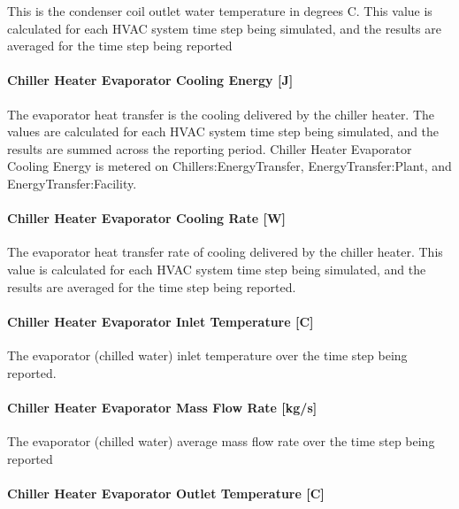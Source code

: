 This is the condenser coil outlet water temperature in degrees C. This value is calculated for each HVAC system time step being simulated, and the results are averaged for the time step being reported

\paragraph{Chiller Heater Evaporator Cooling Energy {[}J{]}}\label{chiller-heater-evaporator-cooling-energy-j}

The evaporator heat transfer is the cooling delivered by the chiller heater. The values are calculated for each HVAC system time step being simulated, and the results are summed across the reporting period. Chiller Heater Evaporator Cooling Energy is metered on Chillers:EnergyTransfer, EnergyTransfer:Plant, and EnergyTransfer:Facility.

\paragraph{Chiller Heater Evaporator Cooling Rate {[}W{]}}\label{chiller-heater-evaporator-cooling-rate-w}

The evaporator heat transfer rate of cooling delivered by the chiller heater. This value is calculated for each HVAC system time step being simulated, and the results are averaged for the time step being reported.

\paragraph{Chiller Heater Evaporator Inlet Temperature {[}C{]}}\label{chiller-heater-evaporator-inlet-temperature-c}

The evaporator (chilled water) inlet temperature over the time step being reported.

\paragraph{Chiller Heater Evaporator Mass Flow Rate {[}kg/s{]}}\label{chiller-heater-evaporator-mass-flow-rate-kgs}

The evaporator (chilled water) average mass flow rate over the time step being reported

\paragraph{Chiller Heater Evaporator Outlet Temperature {[}C{]}}\label{chiller-heater-evaporator-outlet-temperature-c}

